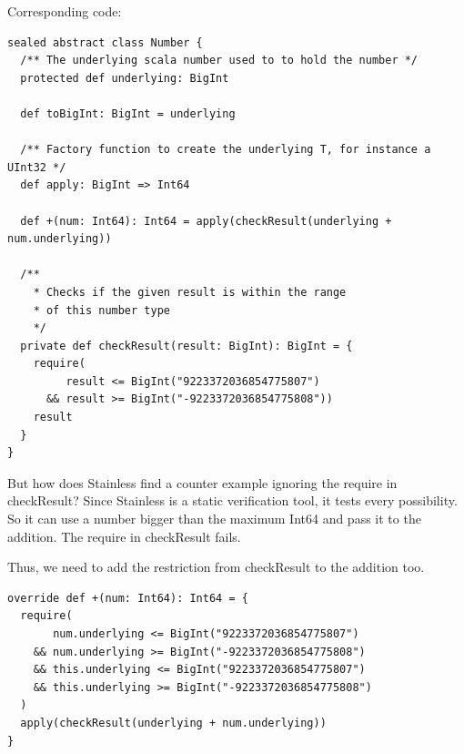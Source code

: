 \documentclass[runningheads]{llncs}
\begin{document}

Corresponding code:
\begin{lstlisting}[style=scala]
sealed abstract class Number {
  /** The underlying scala number used to to hold the number */
  protected def underlying: BigInt

  def toBigInt: BigInt = underlying

  /** Factory function to create the underlying T, for instance a UInt32 */
  def apply: BigInt => Int64

  def +(num: Int64): Int64 = apply(checkResult(underlying + num.underlying))

  /**
    * Checks if the given result is within the range
    * of this number type
    */
  private def checkResult(result: BigInt): BigInt = {
    require(
         result <= BigInt("9223372036854775807")
      && result >= BigInt("-9223372036854775808"))
    result
  }
}
\end{lstlisting}

But how does Stainless find a counter example ignoring the require in checkResult?
Since Stainless is a static verification tool, it tests every possibility.
So it can use a number bigger than the maximum Int64 and pass it to the addition.
The require in checkResult fails.

Thus, we need to add the restriction from checkResult to the addition too.
\begin{lstlisting}[style=scala]
override def +(num: Int64): Int64 = {
  require(
       num.underlying <= BigInt("9223372036854775807")
    && num.underlying >= BigInt("-9223372036854775808")
    && this.underlying <= BigInt("9223372036854775807")
    && this.underlying >= BigInt("-9223372036854775808")
  )
  apply(checkResult(underlying + num.underlying))
}
\end{lstlisting}
\end{document}
